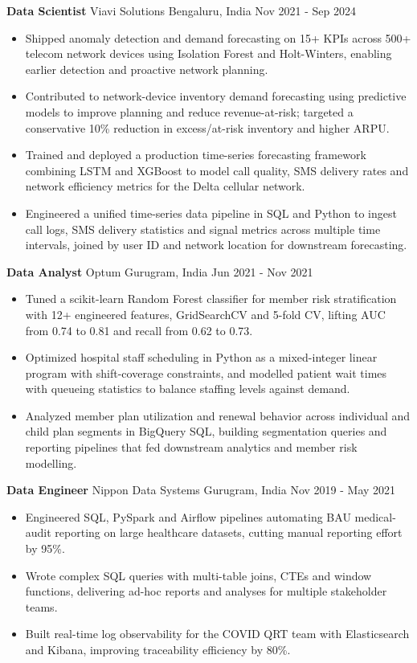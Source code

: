\documentclass[10pt,a4paper]{article}
\newcommand{\role}[4]{\textbf{#1} \textbar{} #2 \hfill #3 \textbar{} #4\par}
\begin{document}
\vspace{3pt}
\role{Data Scientist}{Viavi Solutions}{Bengaluru, India}{Nov 2021 - Sep 2024}
\begin{itemize}
  \item Shipped anomaly detection and demand forecasting on 15+ KPIs across 500+ telecom network devices using Isolation Forest and Holt-Winters, enabling earlier detection and proactive network planning.
  \item Contributed to network-device inventory demand forecasting using predictive models to improve planning and reduce revenue-at-risk; targeted a conservative 10\% reduction in excess/at-risk inventory and higher ARPU.
  \item Trained and deployed a production time-series forecasting framework combining LSTM and XGBoost to model call quality, SMS delivery rates and network efficiency metrics for the Delta cellular network.
  \item Engineered a unified time-series data pipeline in SQL and Python to ingest call logs, SMS delivery statistics and signal metrics across multiple time intervals, joined by user ID and network location for downstream forecasting.
\end{itemize}
\vspace{3pt}
\role{Data Analyst}{Optum}{Gurugram, India}{Jun 2021 - Nov 2021}
\begin{itemize}
  \item Tuned a scikit-learn Random Forest classifier for member risk stratification with 12+ engineered features, GridSearchCV and 5-fold CV, lifting AUC from 0.74 to 0.81 and recall from 0.62 to 0.73.
  \item Optimized hospital staff scheduling in Python as a mixed-integer linear program with shift-coverage constraints, and modelled patient wait times with queueing statistics to balance staffing levels against demand.
  \item Analyzed member plan utilization and renewal behavior across individual and child plan segments in BigQuery SQL, building segmentation queries and reporting pipelines that fed downstream analytics and member risk modelling.
\end{itemize}
\vspace{3pt}
\role{Data Engineer}{Nippon Data Systems}{Gurugram, India}{Nov 2019 - May 2021}
\begin{itemize}
  \item Engineered SQL, PySpark and Airflow pipelines automating BAU medical-audit reporting on large healthcare datasets, cutting manual reporting effort by 95\%.
  \item Wrote complex SQL queries with multi-table joins, CTEs and window functions, delivering ad-hoc reports and analyses for multiple stakeholder teams.
  \item Built real-time log observability for the COVID QRT team with Elasticsearch and Kibana, improving traceability efficiency by 80\%.
\end{itemize}
\end{document}
